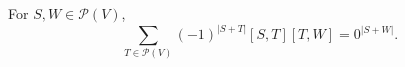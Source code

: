 For $S, W \in \mathcal{P}(V)$,
$$\sum_{T \in \mathcal{P}(V)} (-1)^{|S+T|}[S, T][T, W] = 0^{|S+W|}.$$
